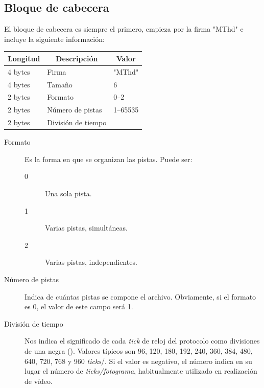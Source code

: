 \subsection{Bloque de cabecera}

El bloque de cabecera es siempre el primero, empieza por la firma "MThd" e incluye la siguiente información:

\smallskip

\begin{center}
	\begin{tabular}{|l|l|l|}
		\hline \multicolumn{1}{|c|}{\textbf{Longitud}} & \multicolumn{1}{c|}{\textbf{Descripción}} & \multicolumn{1}{c|}{\textbf{Valor}} \\
		\hline 4 bytes & Firma & "MThd" \\ 
		\hline 4 bytes & Tamaño & 6 \\ 
		\hline 2 bytes & Formato & 0--2 \\ 
		\hline 2 bytes & Número de pistas & 1--65535 \\ 
		\hline 2 bytes & División de tiempo &  \\ 
		\hline 
	\end{tabular}
	\smallskip
\end{center}

\smallskip

\begin{description}
	\item[Formato] Es la forma en que se organizan las pistas. Puede ser:
	\begin{description}
		\item[0] Una sola pista.
		\item[1] Varias pistas, simultáneas.
		\item[2] Varias pistas, independientes.
	\end{description}
	
	\item[Número de pistas] Indica de cuántas pistas se compone el archivo. Obviamente, si el formato es 0, el valor de este campo será 1.
	
	\item[División de tiempo] Nos indica el significado de cada \textit{tick} de reloj del protocolo como divisiones de una negra (\quarternote). Valores típicos son 96, 120, 180, 192, 240, 360, 384, 480, 640, 720, 768 y 960 \textit{ticks}/\quarternote. Si el valor es negativo, el número indica en su lugar el número de \textit{ticks/fotograma}, habitualmente utilizado en realización de vídeo.
\end{description}

